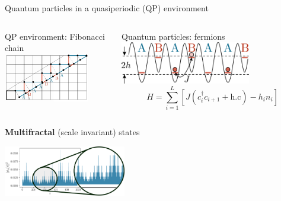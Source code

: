 \begin{frame}{Quantum particles in a quasiperiodic (QP) environment}
\begin{columns}
\begin{column}{0.5\textwidth}
QP environment: Fibonacci chain
\centering
\includegraphics[width=0.8\textwidth]{img/3_Fibonacci/full_cp}
\end{column}
\begin{column}{0.5\textwidth}
Quantum particles: fermions
\centering
\includegraphics[width=0.7\textwidth]{img/1_motivation/XXZ_QP_cold_atoms}
\[
	H = \sum_{i=1}^L \left[ J (c_i^\dagger c_{i+1} + \text{h.c}) - h_i n_i \right]
\]
\end{column}
\end{columns}
\centering
\textbf{Multifractal} (scale invariant) states

\includegraphics[width=0.4\textwidth]{img/1_motivation/one_density_zoom}
\end{frame}

